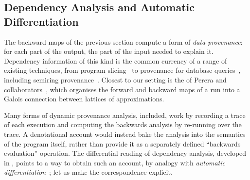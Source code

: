 \subsection{Dependency Analysis and Automatic Differentiation}

The backward maps of the previous section compute a form of \emph{data provenance}: for each part of
the output, the part of the input needed to explain it. Dependency information of this kind is the common
currency of a range of existing techniques, from program slicing~\cite{weiser81} to provenance for database
queries~\cite{buneman95,cheney07}, including semiring provenance~\cite{green07}. Closest
to our setting is the \GPS of Perera and
collaborators~\cite{perera12a,perera16d,ricciotti17}, which organises the forward and backward maps of a run
into a Galois connection between lattices of approximations.

Many forms of dynamic provenance analysis, \GPS included, work by recording a trace of each
execution and computing the backwards analysis by re-running over the trace. A denotational account would
instead bake the analysis into the semantics of the program itself, rather than provide it as a separately
defined ``backwards evaluation'' operation.
The differential reading of dependency analysis, developed in , points to
a way to obtain such an account, by analogy with \emph{automatic
differentiation}~\cite{siskind08,elliott18,vakar22}; let us make the correspondence explicit.

